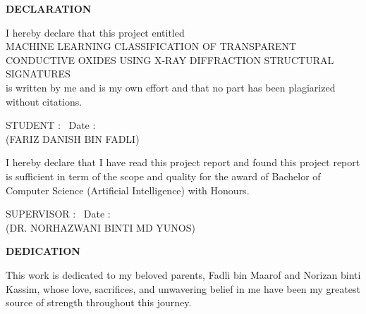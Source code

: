 \documentclass[12pt, oneside]{article} %
\begin{document}
\newpage




\begin{center}

\vfill\null
{}
{}
\textbf{DECLARATION}

\vspace{1.5cm}
I hereby declare that this project entitled \\
MACHINE LEARNING CLASSIFICATION OF TRANSPARENT CONDUCTIVE OXIDES USING X-RAY DIFFRACTION STRUCTURAL SIGNATURES \\
is written by me and is my own effort and that no part has been plagiarized without citations.



\vspace{1.5cm}
\noindent
STUDENT \; : \underline{\hspace{8cm}} \, Date :  \underline{\hspace{2.1cm}} \\[-2mm]
(FARIZ DANISH BIN FADLI) \hspace{1.2cm}



\vspace{4cm}
\noindent
I hereby declare that I have read this project report and found this project report is sufficient in term of the scope and quality for the award of Bachelor of Computer Science (Artificial Intelligence) with Honours.


\vspace{1.5cm}
\noindent
SUPERVISOR \; : \underline{\hspace{8cm}} \, Date :  \underline{\hspace{2.1cm}} \\[-2mm]
(DR. NORHAZWANI BINTI MD YUNOS) \hspace{0.6cm}


\end{center}

\vfill \null

\newpage





\begin{center}
{}
\textbf{DEDICATION}
\end{center}


\vspace{1cm}
This work is dedicated to my beloved parents, Fadli bin Maarof and Norizan binti Kassim, whose love, sacrifices, and unwavering belief in me have been my greatest source of strength throughout this journey.
\end{document}
